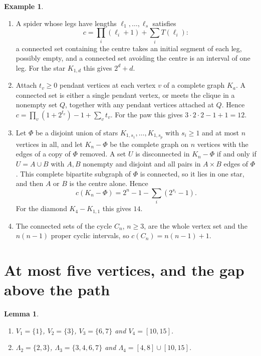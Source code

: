 \documentclass[11pt]{amsart}
\newtheorem{lemma}[theorem]{Lemma}
\theoremstyle{definition}
\newtheorem{example}[theorem]{Example}
\theoremstyle{remark}
\newcommand{\Lam}{\Lambda}
\newcommand{\Tr}[1]{T(#1)}
\begin{document}
\begin{example}\label{ex:formulas}
\begin{enumerate}[label=\textup{(\roman*)}]
\item A spider whose legs have lengths $\ell_1,\dots,\ell_s$ satisfies
\[
c=\prod_i(\ell_i+1)+\sum_i\Tr{\ell_i}:
\]
a connected set containing the centre takes an initial segment of each leg, possibly empty, and a connected set avoiding the centre is an interval of one leg. For the star $K_{1,d}$ this gives $2^d+d$.
\item Attach $t_v\ge0$ pendant vertices at each vertex $v$ of a complete graph $K_a$. A connected set is either a single pendant vertex, or meets the clique in a nonempty set $Q$, together with any pendant vertices attached at $Q$. Hence $c=\prod_v(1+2^{t_v})-1+\sum_vt_v$. For the paw this gives $3\cdot2\cdot2-1+1=12$.
\item Let $\Phi$ be a disjoint union of stars $K_{1,s_1},\dots,K_{1,s_p}$ with $s_i\ge1$ and at most $n$ vertices in all, and let $K_n-\Phi$ be the complete graph on $n$ vertices with the edges of a copy of $\Phi$ removed. A set $U$ is disconnected in $K_n-\Phi$ if and only if $U=A\cup B$ with $A,B$ nonempty and disjoint and all pairs in $A\times B$ edges of $\Phi$. This complete bipartite subgraph of $\Phi$ is connected, so it lies in one star, and then $A$ or $B$ is the centre alone. Hence
\[
c(K_n-\Phi)=2^n-1-\sum_i(2^{s_i}-1).
\]
For the diamond $K_4-K_{1,1}$ this gives $14$.
\item The connected sets of the cycle $C_n$, $n\ge3$, are the whole vertex set and the $n(n-1)$ proper cyclic intervals, so $c(C_n)=n(n-1)+1$.
\end{enumerate}
\end{example}

\section{At most five vertices, and the gap above the path}\label{sec:small}

\begin{lemma}\label{lem:upto4}
\begin{enumerate}[label=\textup{(\alph*)}]
\item $V_1=\{1\}$, $V_2=\{3\}$, $V_3=\{6,7\}$ and $V_4=[10,15]$.
\item $\Lam_2=\{2,3\}$, $\Lam_3=\{3,4,6,7\}$ and $\Lam_4=[4,8]\cup[10,15]$.
\end{enumerate}
\end{lemma}
\end{document}
